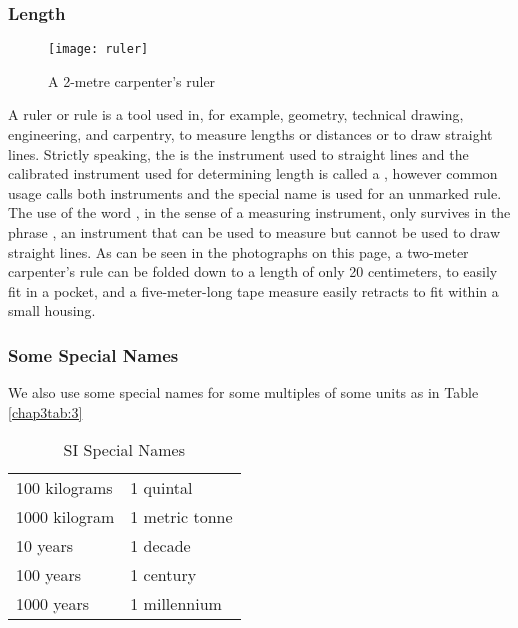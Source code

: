 \subsubsection*{Length}
\begin{figure}[!h]
\centering
\texttt{[image: ruler]}
\caption{A 2-metre carpenter's ruler}
\label{chap3fig:1}
\end{figure}

A ruler or rule is a tool used in, for example, geometry, technical drawing,
engineering, and carpentry, to measure lengths or distances or to draw straight lines.
Strictly speaking, the  is the instrument used to  straight lines and the calibrated
instrument used for determining length is called a , however common usage calls
both instruments  and the special name  is used for an unmarked rule.
The use of the word , in the sense of a measuring instrument, only survives in the
phrase , an instrument that can be used to measure but cannot be used to
draw straight lines. As can be seen in the photographs on this page, a two-meter carpenter's
rule can be folded down to a length of only 20 centimeters, to easily fit in a pocket, and a
five-meter-long tape measure easily retracts to fit within a small housing.

\subsubsection*{Some Special Names}
We also use some special names for some multiples of some units as in Table \eqref{chap3tab:3}
\begin{table}[!h]
\centering
\caption{SI Special Names}
\begin{tabular}{ll}
\hline \hline
100 kilograms & 1 quintal\\
1000 kilogram & 1 metric tonne\\
10 years & 1 decade\\
100 years & 1 century\\
1000 years & 1 millennium\\
\hline
\end{tabular}
\label{chap3tab:3}
\end{table}

